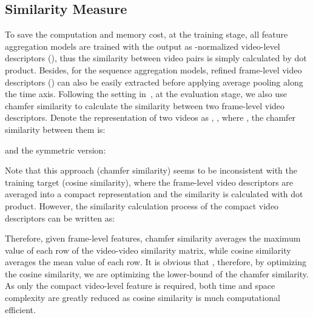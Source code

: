 \documentclass[10pt,twocolumn,letterpaper]{article}
\begin{document}
\subsection{Similarity Measure} \label{subsection:simcal}
To save the computation and memory cost, at the training stage, all feature aggregation models are trained with the output as -normalized video-level descriptors (), thus the similarity between video pairs is simply calculated by dot product. Besides, for the sequence aggregation models, refined frame-level video descriptors () can also be easily extracted before applying average pooling along the time axis. Following the setting in~\cite{kordopatis2019visil}, at the evaluation stage, we also use chamfer similarity to calculate the similarity between two frame-level video descriptors. Denote the representation of two videos as , , where , the chamfer similarity between them is:

and the symmetric version:

Note that this approach (chamfer similarity) seems to be inconsistent with the training target (cosine similarity), where the frame-level video descriptors are averaged into a compact representation and the similarity is calculated with dot product. However, the similarity calculation process of the compact video descriptors can be written as:
{\small

}
Therefore, given frame-level features, chamfer similarity averages the maximum value of each row of the video-video similarity matrix, while cosine similarity averages the mean value of each row. It is obvious that , therefore, by optimizing the cosine similarity, we are optimizing the lower-bound of the chamfer similarity. As only the compact video-level feature is required, both time and space complexity are greatly reduced as cosine similarity is much computational efficient.
\end{document}
